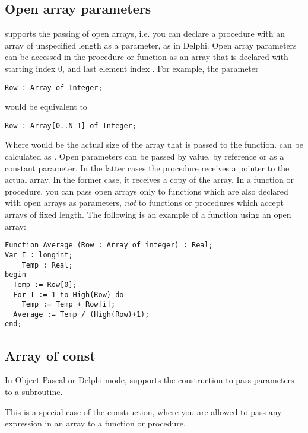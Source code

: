 \documentclass{report}
\begin{document}
\subsection{Open array parameters}
\label{se:openarray}
\fpc supports the passing of open arrays, i.e. you can declare a procedure
with an array of unspecified length as a parameter, as in Delphi.
Open array parameters can be accessed in the procedure or function as an
array that is declared with starting index 0, and last element
index .
For example, the parameter
\begin{verbatim}
Row : Array of Integer;
\end{verbatim}
would be equivalent to
\begin{verbatim}
Row : Array[0..N-1] of Integer;
\end{verbatim}
Where   would be the actual size of the array that is passed to the
function.  can be calculated as .
Open parameters can be passed by value, by reference or as a constant
parameter. In the latter cases the procedure receives a pointer to the
actual array. In the former case, it receives a copy of the array.
In a function or procedure, you can pass open arrays only to functions which
are also declared with open arrays as parameters, {\em not} to functions or
procedures which accept arrays of fixed length.
The following is an example of a function using an open array:
\begin{verbatim}
Function Average (Row : Array of integer) : Real;
Var I : longint;
    Temp : Real;
begin
  Temp := Row[0];
  For I := 1 to High(Row) do
    Temp := Temp + Row[i];
  Average := Temp / (High(Row)+1);
end;
\end{verbatim}
\subsection{Array of const}
In Object Pascal or Delphi mode, \fpc supports the 
construction to pass parameters to a subroutine.

This is a special case of the  construction, where you 
are allowed to pass any expression in an array to a function or procedure.
\end{document}

